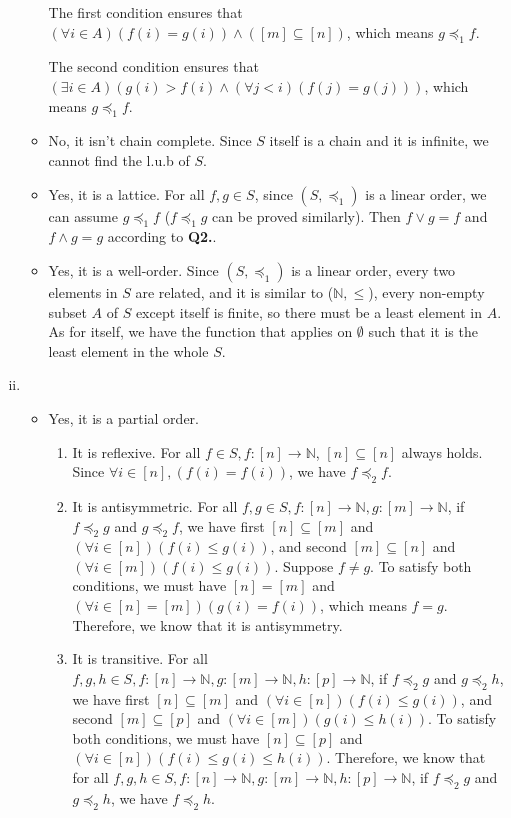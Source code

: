 \documentclass{article}[12pt]
\begin{document}
\begin{enumerate}[(i)]
\begin{itemize}
\par The first condition ensures that $(\forall i \in A)(f(i)=g(i)) \wedge([m] \subseteq[n])$, which means $g\preceq_1 f$.
\par The second condition ensures that $(\exists i \in A)(g(i)>f(i) \wedge(\forall j<i)(f(j)=g(j)))$, which means $g\preceq_1 f$.
\item No, it isn't chain complete. Since $S$ itself is a chain and it is infinite, we cannot find the l.u.b of $S$.
\item Yes, it is a lattice. For all $f,g\in S$, since $\left(S, \preceq_{1}\right)$ is a linear order, we can assume $g\preceq_1 f$ ($f\preceq_1 g$ can be proved similarly). Then $f\vee g=f$ and $f\wedge g=g$ according to \textbf{Q2.}.
\item Yes, it is a well-order. Since $\left(S, \preceq_{1}\right)$ is a linear order, every two elements in $S$ are related, and it is similar to ($\mathbb{N},\leq$), every non-empty subset $A$ of $S$ except itself is finite, so there must be a least element in $A$. As for itself, we have the function that applies on $\emptyset$ such that it is the least element in the whole $S$.
\end{itemize}
\item 
\begin{itemize}
\item Yes, it is a partial order.
\begin{enumerate}
\item It is reflexive. For all $f\in S, f:[n]\rightarrow \mathbb{N}$, $[n]\subseteq [n]$ always holds. Since $\forall i\in [n], (f(i)=f(i))$, we have $f\preceq_2 f$.
\item It is antisymmetric. For all $f,g\in S, f:[n]\rightarrow \mathbb{N},g:[m]\rightarrow \mathbb{N}$, if $f\preceq_2 g$ and $g\preceq_2 f$, we have first $[n] \subseteq[m]$ and $(\forall i \in[n])(f(i) \leq g(i))$, and second $[m] \subseteq[n]$ and $(\forall i \in[m])(f(i) \leq g(i))$. Suppose $f\not=g$. To satisfy both conditions, we must have $[n]=[m]$ and $(\forall i \in[n]=[m])(g(i) = f(i))$, which means $f=g$. Therefore, we know that it is antisymmetry.
\item It is transitive. For all $f,g,h\in S, f:[n]\rightarrow \mathbb{N},g:[m]\rightarrow \mathbb{N}, h:[p]\rightarrow \mathbb{N}$, if $f\preceq_2 g$ and $g\preceq_2 h$, we have first $[n] \subseteq[m]$ and $(\forall i \in[n])(f(i) \leq g(i))$, and second $[m] \subseteq[p]$ and $(\forall i \in[m])(g(i) \leq h(i))$. To satisfy both conditions, we must have $[n] \subseteq[p]$ and $(\forall i \in[n])(f(i)\leq g(i) \leq h(i))$. Therefore, we know that for all $f,g,h\in S, f:[n]\rightarrow \mathbb{N},g:[m]\rightarrow \mathbb{N}, h:[p]\rightarrow \mathbb{N}$, if $f\preceq_2 g$ and $g\preceq_2 h$, we have $f\preceq_2 h$. 

\end{enumerate}
\end{itemize}
\end{enumerate}
\end{document}
